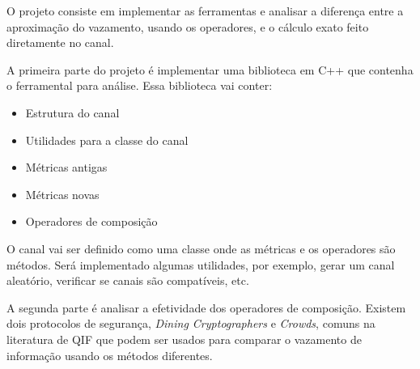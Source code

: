 %
%
%
%

O projeto consiste em implementar as ferramentas e analisar a diferença entre a aproximação do vazamento, usando os operadores, e o cálculo exato feito diretamente no canal.

A primeira parte do projeto é implementar uma biblioteca em C++ que contenha o ferramental para análise. Essa biblioteca vai conter:

\begin{itemize}
  \item{Estrutura do canal}
  \item{Utilidades para a classe do canal}
  \item{Métricas antigas}
  \item{Métricas novas}
  \item{Operadores de composição}
\end{itemize}

O canal vai ser definido como uma classe onde as métricas e os operadores são métodos. 
Será implementado algumas utilidades, por exemplo, gerar um canal aleatório, verificar se canais são compatíveis, etc.

A segunda parte é analisar a efetividade dos operadores de composição.
Existem dois protocolos de segurança, \emph{Dining Cryptographers}\cite{Chaum:88:JC} e \emph{Crowds}\cite{Reiter:98:TISS}, comuns na literatura de QIF que podem ser usados para comparar o vazamento de informação usando os métodos diferentes.
